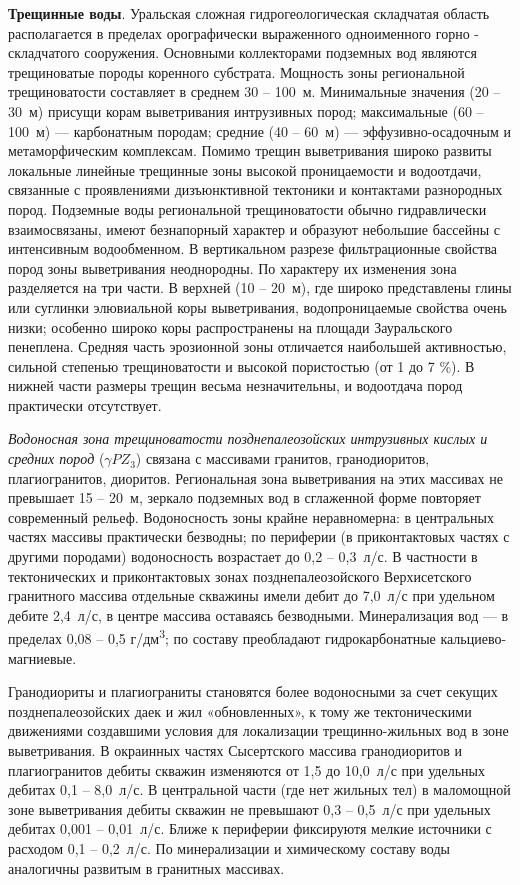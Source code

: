 \textbf{Трещинные воды}. Уральская сложная гидрогеологическая складчатая область располагается в пределах орографически выраженного одноименного горно - складчатого сооружения. Основными коллекторами подземных вод являются трещиноватые породы коренного субстрата. Мощность зоны региональной трещиноватости составляет в среднем 30  --  100~м. Минимальные значения (20  --  30~м) присущи корам выветривания интрузивных пород; максимальные (60  --  100~м)  ---  карбонатным породам; средние (40  --  60~м)  ---  эффузивно-осадочным и метаморфическим комплексам. Помимо трещин выветривания широко развиты локальные линейные трещинные зоны высокой проницаемости и водоотдачи, связанные с проявлениями дизъюнктивной тектоники и контактами разнородных пород. Подземные воды региональной трещиноватости обычно гидравлически взаимосвязаны, имеют безнапорный характер и образуют небольшие бассейны с интенсивным
водообменном. В вертикальном разрезе фильтрационные свойства пород зоны выветривания неоднородны. По характеру их изменения зона разделяется на три части. В верхней (10  --  20~м), где широко представлены глины или суглинки элювиальной коры выветривания, водопроницаемые свойства очень низки; особенно широко коры распространены на площади Зауральского пенеплена. Средняя часть эрозионной зоны отличается наибольшей активностью, сильной степенью трещиноватости и высокой пористостью (от 1 до 7 \%). В нижней части размеры трещин весьма незначительны, и водоотдача пород практически отсутствует.

\textit{Водоносная зона трещиноватости позднепалеозойских интрузивных кислых и средних пород} ($\gamma PZ_3$) связана с массивами гранитов, гранодиоритов, плагиогранитов, диоритов. Региональная зона выветривания на этих массивах не превышает 15  --  20~м, зеркало подземных вод в сглаженной форме повторяет современный рельеф. Водоносность зоны крайне неравномерна: в центральных частях массивы практически безводны; по периферии (в приконтактовых частях с другими породами) водоносность возрастает до 0,2  --  0,3~л/с. В частности в тектонических и приконтактовых зонах позднепалеозойского Верхисетского гранитного массива отдельные скважины имели дебит до 7,0~л/с при удельном дебите 2,4~л/с, в центре массива оставаясь безводными. Минерализация вод  ---  в пределах 0,08 -- 0,5 г/дм\textsuperscript{3}; по составу преобладают гидрокарбонатные  кальциево-магниевые.

Гранодиориты и плагиограниты становятся более водоносными за счет секущих позднепалеозойских даек и жил «обновленных», к тому же тектоническими движениями создавшими условия для локализации трещинно-жильных вод в зоне выветривания. В окраинных частях Сысертского массива гранодиоритов и плагиогранитов дебиты скважин изменяются от 1,5 до 10,0~л/с при удельных дебитах 0,1  --  8,0~л/с. В центральной части (где нет жильных тел) в маломощной зоне выветривания дебиты скважин не превышают 0,3  --  0,5~л/с при удельных дебитах 0,001 -- 0,01~л/с. Ближе к периферии фиксируютя мелкие источники с расходом 0,1  --  0,2~л/с. По минерализации и химическому составу воды аналогичны развитым в гранитных массивах. 

